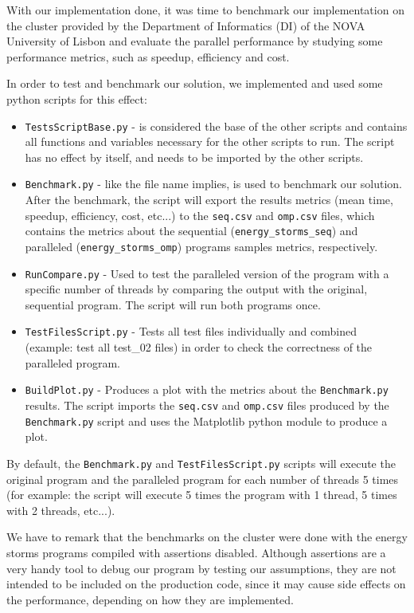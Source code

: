 With our implementation done, it was time to benchmark our implementation on the cluster provided by the Department of Informatics (DI) of the NOVA University of Lisbon and evaluate the parallel performance by studying some performance metrics, such as speedup, efficiency and cost. 
\par In order to test and benchmark our solution, we implemented and used some python scripts for this effect:
\begin{itemize}
    \item \verb|TestsScriptBase.py| - is considered the base of the other scripts and contains all functions and variables necessary for the other scripts to run. The script has no effect by itself, and needs to be imported by the other scripts.
    \item \verb|Benchmark.py| - like the file name implies, is used to benchmark our solution. After the benchmark, the script will export the results metrics (mean time, speedup, efficiency, cost, etc...) to the \verb|seq.csv| and \verb|omp.csv| files, which contains the metrics about the sequential (\verb|energy_storms_seq|) and paralleled (\verb|energy_storms_omp|) programs samples metrics, respectively.
    \item \verb|RunCompare.py| - Used to test the paralleled version of the program with a specific number of threads by comparing the output with the original, sequential program. The script will run both programs once.
    \item \verb|TestFilesScript.py| - Tests all test files individually and combined (example: test all test\_02 files) in order to check the correctness of the paralleled program.     
    \item \verb|BuildPlot.py| - Produces a plot with the metrics about the \verb|Benchmark.py| results. The script imports the \verb|seq.csv| and \verb|omp.csv| files produced by the \verb|Benchmark.py| script and uses the Matplotlib python module to produce a plot.   
\end{itemize}
By default, the \verb|Benchmark.py| and \verb|TestFilesScript.py| scripts will execute the original program and the paralleled program for each number of threads 5 times (for example: the script will execute 5 times the program with 1 thread, 5 times with 2 threads, etc...).
\par We have to remark that the benchmarks on the cluster were done with the energy storms programs compiled with assertions disabled. Although assertions are a very handy tool to debug our program by testing our assumptions, they are not intended to be included on the production code, since it may cause side effects on the performance, depending on how they are implemented. 
